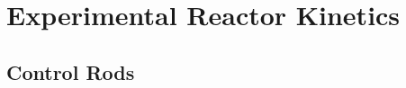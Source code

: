 \documentclass[11pt,a4paper,twoside]{book}
\begin{document}

\pagestyle{fancy} %

\part{Experimental Reactor Kinetics}
\chapter{Control Rods}
\graphicspath{{chapters/experimental_reactor_kinetics/images/}}








%
\end{document}
